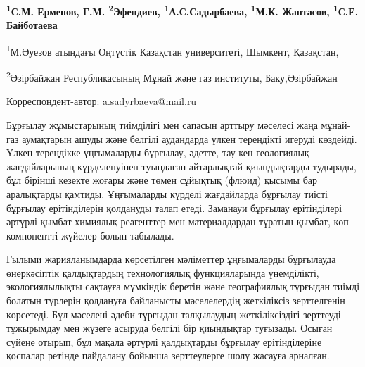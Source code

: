 
\begin{articleheader}

{\bfseries \textsuperscript{1}С.М. Ерменов, Г.М.
\textsuperscript{2}Эфендиев,
\textsuperscript{1}А.С.Садырбаева\textsuperscript{\envelope },
\textsuperscript{1}М.К. Жантасов, \textsuperscript{1}С.Е. Байботаева}
\end{articleheader}
\begin{affiliation}

\textsuperscript{1}М.Әуезов атындағы Оңтүстік Қазақстан университеті,
Шымкент, Қазақстан,

\textsuperscript{2}Әзірбайжан Республикасының Мұнай және газ институты,
Баку,Әзірбайжан

\raggedright {\bfseries \textsuperscript{\envelope }}Корреспондент-автор: a.sadyrbaeva@mail.ru
\end{affiliation}

Бұрғылау жұмыстарының тиімділігі мен сапасын арттыру мәселесі жаңа
мұнай-газ аумақтарын ашуды және белгілі аудандарда үлкен тереңдікті
игеруді көздейді. Үлкен тереңдікке ұңғымаларды бұрғылау, әдетте, тау-кен
геологиялық жағдайларының күрделенуінен туындаған айтарлықтай
қиындықтарды тудырады, бұл бірінші кезекте жоғары және төмен сұйықтық
(флюид) қысымы бар аралықтарды қамтиды. Ұңғымаларды күрделі жағдайларда
бұрғылау тиісті бұрғылау ерітінділерін қолдануды талап етеді. Заманауи
бұрғылау ерітінділері әртүрлі қымбат химиялық реагенттер мен
материалдардан тұратын қымбат, көп компонентті жүйелер болып табылады.

Ғылыми жарияланымдарда көрсетілген мәліметтер ұңғымаларды бұрғылауда
өнеркәсіптік қалдықтардың технологиялық функцияларында үнемділікті,
экологиялылықты сақтауға мүмкіндік беретін және географиялық тұрғыдан
тиімді болатын түрлерін қолдануға байланысты мәселелердің жеткіліксіз
зерттелгенін көрсетеді. Бұл мәселені әдеби тұрғыдан талқылаудың
жеткіліксіздігі зерттеуді тұжырымдау мен жүзеге асыруда белгілі бір
қиындықтар туғызады. Осыған сүйене отырып, бұл мақала әртүрлі
қалдықтарды бұрғылау ерітінділеріне қоспалар ретінде пайдалану бойынша
зерттеулерге шолу жасауға арналған.

